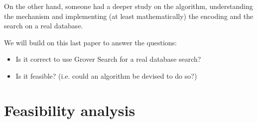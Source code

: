 On the other hand, someone had a deeper study on the algorithm, understanding the mechanism and implementing (at least mathematically) the encoding and the search on a real database. \cite{alsing2011grover}

\bigskip

We will build on this last paper to answer the questions:
\begin{itemize}
	\item Is it correct to use Grover Search for a real database search?
	\item Is it feasible? (i.e. could an algorithm be devised to do so?)
\end{itemize}



\section{Feasibility analysis}

